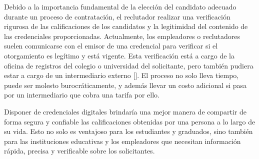 Debido a la importancia fundamental de la elección del candidato adecuado durante un proceso de contratación, el reclutador realizar una verificación rigurosa de las calificaciones de los candidatos y la legitimidad del contenido de las credenciales proporcionadas. Actualmente, los empleadores o reclutadores suelen comunicarse con el emisor de una credencial para verificar si el otorgamiento es legítimo y está vigente. Esta verificación está a cargo de la oficina de registros del colegio o universidad del solicitante, pero también pudiera estar a cargo de un intermediario externo [\cite{63,71}]. El proceso no solo lleva tiempo, puede ser molesto burocráticamente, y además llevar un costo adicional si pasa por un intermediario que cobra una tarifa por ello.



Disponer de credenciales digitales brindaría una mejor manera de compartir de forma segura y confiable las calificaciones obtenidas por una persona a lo largo de su vida. Esto no solo es ventajoso para los estudiantes y graduados, sino también para las instituciones educativas y los empleadores que necesitan información rápida, precisa y verificable sobre los solicitantes.


